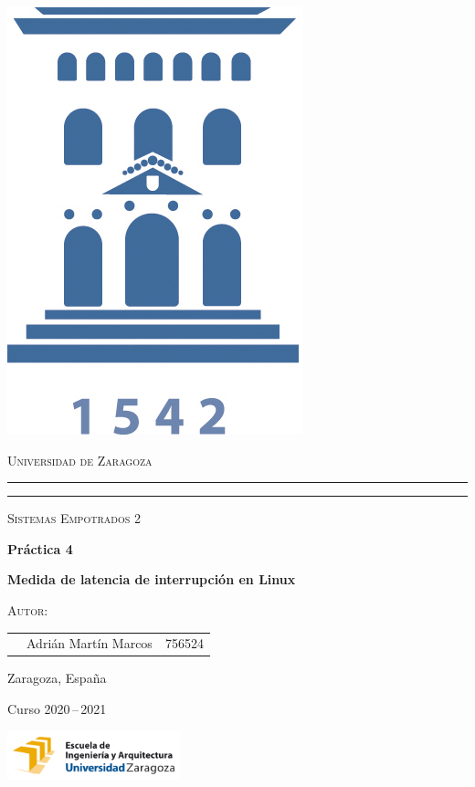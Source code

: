 \documentclass[a4paper,10pt]{article}
\begin{document}
\begin{titlepage}
    \centering
    \includegraphics[width=1 cm]{logoUZ.jpg}
    
    \textsc{\large Universidad de Zaragoza}
    \rule{\textwidth}{1.6pt}\vspace*{-\baselineskip}\vspace*{2pt} %
    \rule{\textwidth}{0.4pt} %
    
    \vfill
    
    {\LARGE \scshape Sistemas Empotrados 2}
                
    \vspace{2cm}            

    {\bfseries \Huge Práctica 4}
    
    \vspace{.5cm} 
    
    {\bfseries \Large Medida de latencia de interrupción en Linux}
    
    \vspace{3cm}    
    
   

    {\scshape Autor:}


    \vspace{0.2cm}
    
    \large
    \begin{tabular}{c l l}
    \large             & Adrián Martín Marcos       & 756524 \\
     \end{tabular}

    \vfill
    
    \large{Zaragoza, España}
    
    {Curso 2020\,--\,2021}

    \vfill

    \includegraphics[width=5.0cm]{EINA.png}
   
\end{titlepage}



\vspace*{2cm}
\end{document}
